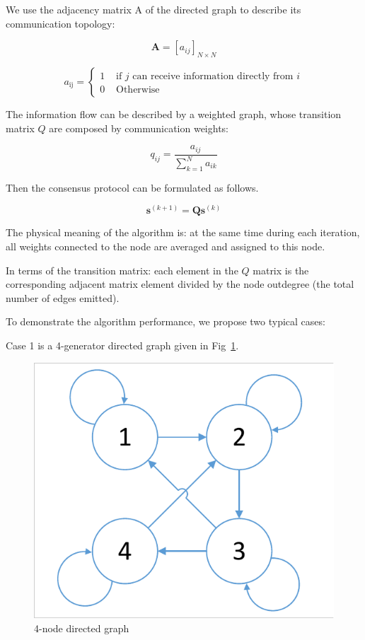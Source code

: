 \documentclass[conference]{IEEEtran}
\begin{document}
We use the adjacency matrix A of the directed graph to describe its communication topology:

\begin{equation}
    \mathbf{A}=\left[a_{i j}\right]_{N \times N}
\end{equation}

\begin{equation}
    a_{\mathrm{ij}}=\left\{\begin{array}{ll}
    {1} & {\text { if } j \text{ can receive information directly from } i } \\
    {0} & {\text { Otherwise }}
    \end{array}\right.
\end{equation}

The information flow can be described by a weighted graph, whose transition matrix $Q$ are composed by communication weights:

\begin{equation}
    q_{i j}=\frac{a_{i j}}{\sum_{k=1}^{N} a_{i k}}
\end{equation}

Then the consensus protocol can be formulated as follows.

\begin{equation}\boldsymbol{s}^{(k+1)}=\boldsymbol{Q} \boldsymbol{s}^{(k)}\end{equation}

The physical meaning of the algorithm is: at the same time during each iteration, all weights connected to the node are averaged and assigned to this node.

In terms of the transition matrix: each element in the $Q$ matrix is the corresponding adjacent matrix element divided by the node outdegree (the total number of edges emitted).

To demonstrate the algorithm performance, we propose two typical cases:

Case 1 is a 4-generator directed graph given in Fig~\ref{fig:Directed-graph}.

\begin{figure}[htbp] %
    \centering
    \includegraphics[width=0.6\columnwidth]{Directed-graph.pdf}
    \caption{4-node directed graph}
    \label{fig:Directed-graph}
\end{figure}
\end{document}
